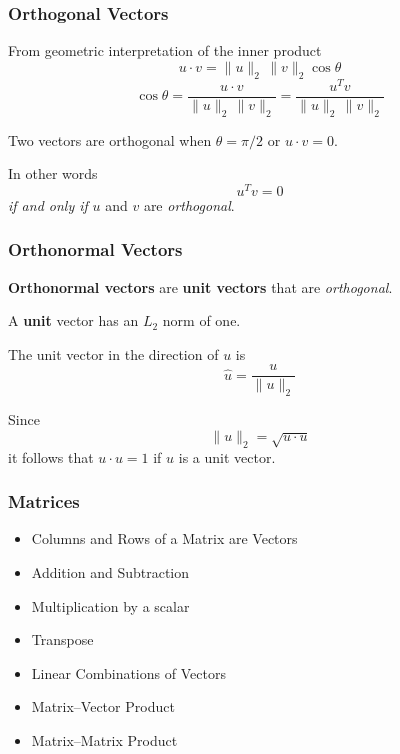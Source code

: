 \documentclass[10pt]{beamer}
\begin{document}
\begin{frame}
\frametitle{Orthogonal Vectors}

From geometric interpretation of the inner product
\begin{equation*}
    u\cdot v = \|u\|_{2}\,\|v\|_{2}\cos\theta
\end{equation*}
\begin{equation*}
    \cos\theta = \frac{u\cdot v}{\|u\|_{2}\,\|v\|_{2}}
               = \frac{u^T v}{\|u\|_{2}\,\|v\|_{2}}
\end{equation*}

Two vectors are orthogonal when $\theta = \pi/2$ or $u\cdot v = 0$.

In other words
\begin{equation*}
    u^T v = 0
\end{equation*}
\emph{if and only if} $u$ and $v$ are \emph{orthogonal}.

\end{frame}
\begin{frame}
\frametitle{Orthonormal Vectors}

\textbf{Orthonormal vectors} are \textbf{unit vectors} that are \emph{orthogonal}.

A \textbf{unit} vector has an $L_2$ norm of one.

The unit vector in the direction of $u$ is
\begin{equation*}
    \hat{u} = \frac{u}{\|u\|_{2}}
\end{equation*}

Since
\begin{equation*}
    \|u\|_{2} = \sqrt{u\cdot u}
\end{equation*}
it follows that $u\cdot u = 1$ if $u$ is a unit vector.

\end{frame}
\begin{frame}
\frametitle{Matrices}

\begin{itemize}
    \item   Columns and Rows of a Matrix are Vectors
    \item   Addition and Subtraction
    \item   Multiplication by a scalar
    \item   Transpose
    \item   Linear Combinations of Vectors
    \item   Matrix--Vector Product
    \item   Matrix--Matrix Product
\end{itemize}

\end{frame}
\end{document}
